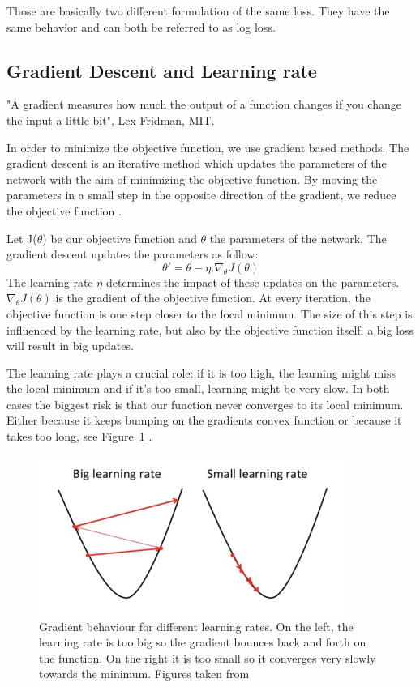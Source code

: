 Those are basically two different formulation of the same loss. They have the same behavior and can both be referred to as log loss. 
\subsection{Gradient Descent and Learning rate}
 "A gradient measures how much the output of a function changes if you change the input a little bit", Lex Fridman, MIT. 


In order to minimize the objective function, we use gradient based methods. The gradient descent is an iterative method which updates the parameters of the network with the aim of minimizing the objective function. By moving the parameters in a small step in the opposite direction of the gradient, we reduce the objective function \cite{cs231n}. 

Let J(\(\theta\)) be our objective function and \(\theta\) the parameters of the network. The gradient descent updates the parameters as follow: \[\theta' = \theta - \eta . \nabla_\theta J(\theta) \] The learning rate \(\eta\) determines the impact of these updates on the parameters. \(\nabla_\theta J(\theta) \) is the gradient of the objective function. At every iteration, the objective function is one step closer to the local minimum. The size of this step is influenced by the learning rate, but also by the objective function itself: a big loss will result in big updates. 


The learning rate plays a crucial role: if it is too high, the learning might miss the local minimum and if it's too small, learning might be very slow. In both cases the biggest risk is that our function never converges to its local minimum. Either because it keeps bumping on the gradients convex function or because it takes too long, see Figure~\ref{fig:LR}  \cite{cs231n}.  
\begin{figure}[!htp]
    \centering
        \includegraphics[width=0.9\textwidth]{figures/02-LR}
        \caption[Gradient behaviour for different learning rates]{Gradient behaviour for different learning rates. On the left, the learning rate is too big so the gradient bounces back and forth on the function. On the right it is too small so it converges very slowly towards the minimum. Figures taken from \cite{gradient} }\label{fig:LR}
\end{figure}

